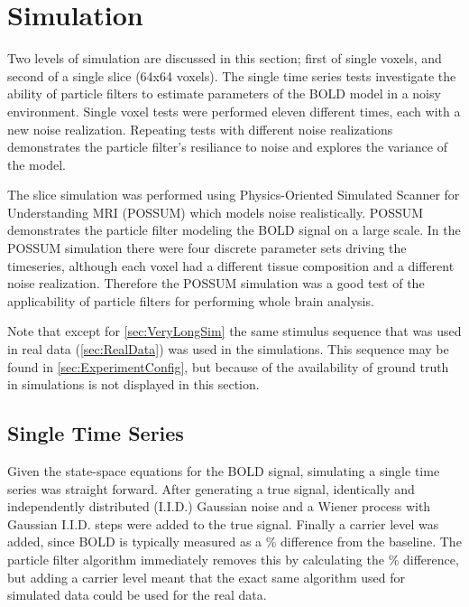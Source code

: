 \chapter{Simulation}
\label{sec:SimulationResults}
Two levels of simulation are discussed in this section; first of single voxels,
and second of a single slice (64x64 voxels).  The single time series tests
investigate the ability of particle filters to estimate parameters of the BOLD model 
in a noisy environment. Single voxel tests were
performed eleven different times, each with a new noise realization.
Repeating tests with different noise realizations demonstrates the 
particle filter's resiliance to noise and explores the variance of
the model. 

The slice simulation was performed using 
Physics-Oriented Simulated Scanner for Understanding MRI (POSSUM) which
models noise realistically. POSSUM demonstrates the 
particle filter modeling the BOLD signal on a large scale. 
In the POSSUM simulation there were four
discrete parameter sets driving the timeseries, although each voxel had a 
different tissue composition and a different
noise realization. Therefore the POSSUM simulation was 
a good test of the applicability of particle filters for performing
whole brain analysis. 

Note that except for \autoref{sec:VeryLongSim} the same stimulus sequence
that was used in real data (\autoref{sec:RealData}) was used in the simulations. This sequence may
be found in \autoref{sec:ExperimentConfig}, but because of the availability of ground
truth in simulations is not displayed in this section.

\section{Single Time Series}
\label{sec:Single Voxel Simulation}
Given the state-space equations for the BOLD signal, simulating a single time 
series was straight forward. After generating a true signal,
identically and independently distributed (I.I.D.) Gaussian noise and a Wiener
process with Gaussian I.I.D. steps were added to the true signal. Finally a 
carrier level was added, since BOLD is typically
measured as a \% difference from the baseline. The particle filter
algorithm immediately removes this by calculating the \% difference, 
but adding a carrier level meant that the exact same algorithm used 
for simulated data could be used for the real data. 

